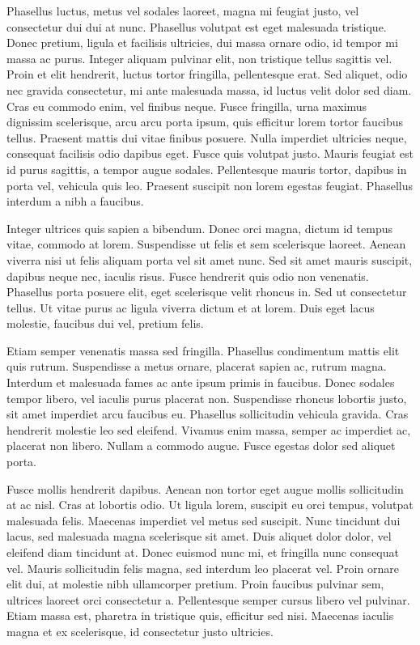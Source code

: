 \documentclass{homework}
\begin{document}
Phasellus luctus, metus vel sodales laoreet, magna mi feugiat justo, vel consectetur dui dui at nunc. Phasellus volutpat est eget malesuada tristique. Donec pretium, ligula et facilisis ultricies, dui massa ornare odio, id tempor mi massa ac purus. Integer aliquam pulvinar elit, non tristique tellus sagittis vel. Proin et elit hendrerit, luctus tortor fringilla, pellentesque erat. Sed aliquet, odio nec gravida consectetur, mi ante malesuada massa, id luctus velit dolor sed diam. Cras eu commodo enim, vel finibus neque. Fusce fringilla, urna maximus dignissim scelerisque, arcu arcu porta ipsum, quis efficitur lorem tortor faucibus tellus. Praesent mattis dui vitae finibus posuere. Nulla imperdiet ultricies neque, consequat facilisis odio dapibus eget. Fusce quis volutpat justo. Mauris feugiat est id purus sagittis, a tempor augue sodales. Pellentesque mauris tortor, dapibus in porta vel, vehicula quis leo. Praesent suscipit non lorem egestas feugiat. Phasellus interdum a nibh a faucibus.

Integer ultrices quis sapien a bibendum. Donec orci magna, dictum id tempus vitae, commodo at lorem. Suspendisse ut felis et sem scelerisque laoreet. Aenean viverra nisi ut felis aliquam porta vel sit amet nunc. Sed sit amet mauris suscipit, dapibus neque nec, iaculis risus. Fusce hendrerit quis odio non venenatis. Phasellus porta posuere elit, eget scelerisque velit rhoncus in. Sed ut consectetur tellus. Ut vitae purus ac ligula viverra dictum et at lorem. Duis eget lacus molestie, faucibus dui vel, pretium felis.

Etiam semper venenatis massa sed fringilla. Phasellus condimentum mattis elit quis rutrum. Suspendisse a metus ornare, placerat sapien ac, rutrum magna. Interdum et malesuada fames ac ante ipsum primis in faucibus. Donec sodales tempor libero, vel iaculis purus placerat non. Suspendisse rhoncus lobortis justo, sit amet imperdiet arcu faucibus eu. Phasellus sollicitudin vehicula gravida. Cras hendrerit molestie leo sed eleifend. Vivamus enim massa, semper ac imperdiet ac, placerat non libero. Nullam a commodo augue. Fusce egestas dolor sed aliquet porta.

Fusce mollis hendrerit dapibus. Aenean non tortor eget augue mollis sollicitudin at ac nisl. Cras at lobortis odio. Ut ligula lorem, suscipit eu orci tempus, volutpat malesuada felis. Maecenas imperdiet vel metus sed suscipit. Nunc tincidunt dui lacus, sed malesuada magna scelerisque sit amet. Duis aliquet dolor dolor, vel eleifend diam tincidunt at. Donec euismod nunc mi, et fringilla nunc consequat vel. Mauris sollicitudin felis magna, sed interdum leo placerat vel. Proin ornare elit dui, at molestie nibh ullamcorper pretium. Proin faucibus pulvinar sem, ultrices laoreet orci consectetur a. Pellentesque semper cursus libero vel pulvinar. Etiam massa est, pharetra in tristique quis, efficitur sed nisi. Maecenas iaculis magna et ex scelerisque, id consectetur justo ultricies.
\end{document}
